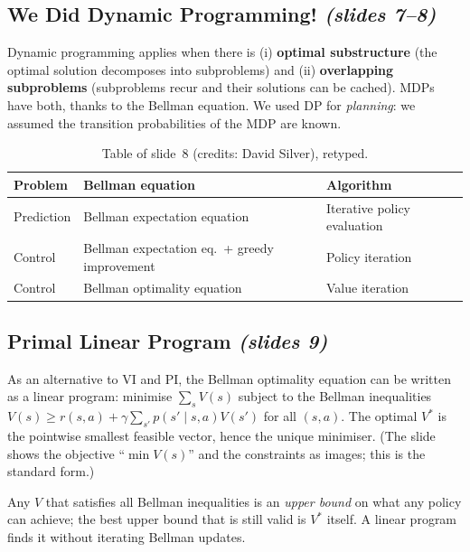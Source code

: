 \documentclass[11pt,a4paper]{article}
\newcommand{\slides}[1]{\emph{(slides #1)}}
\theoremstyle{plain}
\theoremstyle{definition}
\theoremstyle{remark}
\begin{document}
\subsection{We Did Dynamic Programming! \slides{7--8}}

Dynamic programming applies when there is (i) \textbf{optimal substructure} (the optimal solution decomposes into subproblems) and (ii) \textbf{overlapping subproblems} (subproblems recur and their solutions can be cached). MDPs have both, thanks to the Bellman equation. We used DP for \emph{planning}: we assumed the transition probabilities of the MDP are known.

\begin{table}[h]
\centering
\begin{tabular}{@{}lll@{}}
\toprule
\textbf{Problem} & \textbf{Bellman equation} & \textbf{Algorithm}\\
\midrule
Prediction & Bellman expectation equation & Iterative policy evaluation\\
Control & Bellman expectation eq.\ + greedy improvement & Policy iteration\\
Control & Bellman optimality equation & Value iteration\\
\bottomrule
\end{tabular}
\caption{Table of slide~8 (credits: David Silver), retyped.}
\end{table}

\subsection{Primal Linear Program \slides{9}}

As an alternative to VI and PI, the Bellman optimality equation can be written as a linear program: minimise $\sum_s V(s)$ subject to the Bellman inequalities $V(s)\ge r(s,a)+\gamma\sum_{s'}p(s'\mid s,a)V(s')$ for all $(s,a)$. The optimal $V^*$ is the pointwise smallest feasible vector, hence the unique minimiser. (The slide shows the objective ``$\min V(s)$'' and the constraints as images; this is the standard form.)

\begin{intuition}
Any $V$ that satisfies all Bellman inequalities is an \emph{upper bound} on what any policy can achieve; the best upper bound that is still valid is $V^*$ itself. A linear program finds it without iterating Bellman updates.
\end{intuition}

\end{document}
